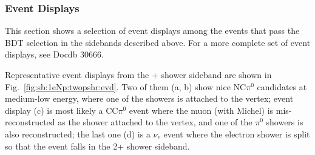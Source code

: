 \subsubsection{Event Displays}

This section shows a selection of event displays among the events that pass the BDT selection in the \npsel sidebands described above. For a more complete set of event displays, see Docdb 30666. 

Representative event displays from the + shower sideband are shown in Fig.~\ref{fig:sb:1eNp:twopshr:evd}. Two of them (a, b) show nice NC$\pi^0$ candidates at medium-low energy, where one of the showers is attached to the vertex; event display (c) is most likely a CC$\pi^0$ event where the muon (with Michel) is mis-reconstructed as the shower attached to the vertex, and one of the $\pi^0$ showers is also reconstructed; the last one (d) is a $\nu_e$ event where the electron shower is split so that the event falls in the 2+ shower sideband.

